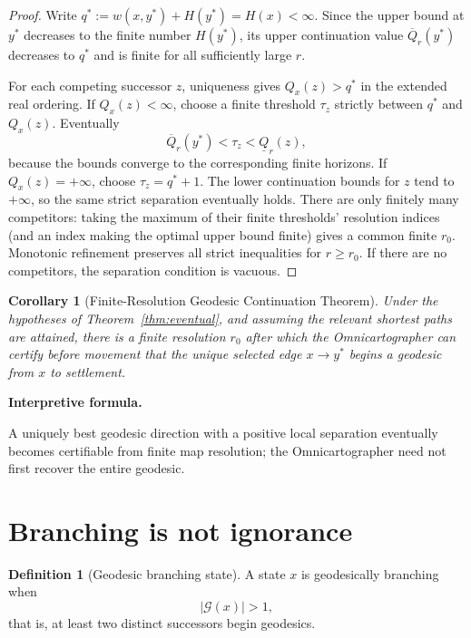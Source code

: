 \documentclass[11pt]{article}
\newtheorem{corollary}[theorem]{Corollary}
\theoremstyle{definition}
\newtheorem{definition}[theorem]{Definition}
\theoremstyle{remark}
\newcommand{\Qval}{Q}
\newenvironment{interpretiveformula}{%
  \begin{center}\begin{minipage}{0.92\linewidth}\small
  \textbf{Interpretive formula.}\ \raggedright}{\end{minipage}\end{center}}
\begin{document}
\begin{proof}
Write $q^*:=w(x,y^*)+H(y^*)=H(x)<\infty$. Since the upper bound at $y^*$ decreases to the finite number $H(y^*)$, its upper continuation value $\overline{\Qval}_r(y^*)$ decreases to $q^*$ and is finite for all sufficiently large $r$.

For each competing successor $z$, uniqueness gives $\Qval_x(z)>q^*$ in the extended real ordering. If $\Qval_x(z)<\infty$, choose a finite threshold $\tau_z$ strictly between $q^*$ and $\Qval_x(z)$. Eventually
\[
\overline{\Qval}_r(y^*)<\tau_z<\underline{\Qval}_r(z),
\]
because the bounds converge to the corresponding finite horizons. If $\Qval_x(z)=+\infty$, choose $\tau_z=q^*+1$. The lower continuation bounds for $z$ tend to $+\infty$, so the same strict separation eventually holds. There are only finitely many competitors: taking the maximum of their finite thresholds' resolution indices (and an index making the optimal upper bound finite) gives a common finite $r_0$. Monotonic refinement preserves all strict inequalities for $r\ge r_0$. If there are no competitors, the separation condition is vacuous.
\end{proof}

\begin{corollary}[Finite-Resolution Geodesic Continuation Theorem]\label{cor:finite-geodesic}
Under the hypotheses of Theorem~\ref{thm:eventual}, and assuming the relevant shortest paths are attained, there is a finite resolution $r_0$ after which the Omnicartographer can certify before movement that the unique selected edge $x\to y^*$ begins a geodesic from $x$ to settlement.
\end{corollary}

\begin{interpretiveformula}
A uniquely best geodesic direction with a positive local separation eventually becomes certifiable from finite map resolution; the Omnicartographer need not first recover the entire geodesic.
\end{interpretiveformula}

\section{Branching is not ignorance}

\begin{definition}[Geodesic branching state]
A state $x$ is geodesically branching when
\[
|\mathcal G(x)|>1,
\]
that is, at least two distinct successors begin geodesics.
\end{definition}
\end{document}
